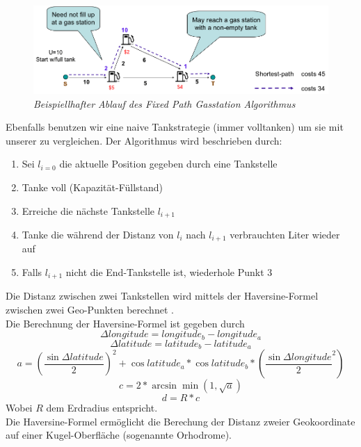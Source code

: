 \documentclass[
ngerman          %
,a4paper          %
,11pt
,pdftex
]{report}
\begin{document}
\begin{figure}
	\centering
	\includegraphics[width=0.7\linewidth]{images/fixedgas}
	\caption[Beispiel Ablauf]{\textit{Beispiellhafter Ablauf des Fixed Path Gasstation Algorithmus  \cite{fixedgasimage}}} 
	\label{fig:fixedgas}
\end{figure}

Ebenfalls benutzen wir eine naive Tankstrategie (immer volltanken) um sie mit unserer zu vergleichen. Der Algorithmus wird beschrieben durch:

\begin{enumerate}
\item Sei $l_{i=0}$ die aktuelle Position gegeben durch eine Tankstelle
\item Tanke voll (Kapazität-Füllstand)
\item Erreiche die nächste Tankstelle $l_{i+1}$
\item Tanke die während der Distanz von $l_{i}$ nach $l_{i+1}$ verbrauchten Liter wieder auf
\item Falls $l_{i+1}$ nicht die End-Tankstelle ist, wiederhole Punkt $3$
\end{enumerate}

Die Distanz zwischen zwei Tankstellen wird mittels der Haversine-Formel zwischen zwei Geo-Punkten berechnet \cite{haversine}.\\
Die Berechnung der Haversine-Formel ist gegeben durch
$$ \Delta longitude = longitude_b - longitude_a $$
$$ \Delta latitude = latitude_b - latitude_a $$
$$ a = (\frac{\sin \Delta latitude}{2})^2 + \cos latitude_a * \cos latitude_b * (\frac{\sin \Delta longitude}{2}^2)$$
$$ c = 2 * \arcsin \min(1,\sqrt{a})$$
$$ d = R * c $$
Wobei $R$ dem Erdradius entspricht.\\
Die Haversine-Formel ermöglicht die Berechung der Distanz zweier Geokoordinate auf einer Kugel-Oberfläche (sogenannte Orhodrome).
\end{document}
